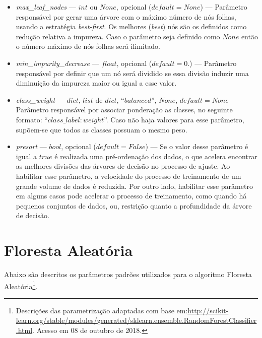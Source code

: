 \documentclass[
	12pt,				%
	oneside,			%
	a4paper,			%
	english,			%
	brazil				%
	]{abntex2ppgsi}
\begin{document}
{{\begin{apendicesenv}
\begin{itemize}
\item \textit{max\_leaf\_nodes} --- $int$ ou $None$, opcional ($default=None$) --- Parâmetro responsável por gerar uma árvore com o máximo número de nós folhas, usando a estratégia \textit{best-first}.
Os melhores (\textit{best}) nós são os definidos como redução relativa a impureza. Caso o parâmetro seja definido como $None$ então o número máximo de nós folhas será ilimitado. 
\item \textit{min\_impurity\_decrease} --- $float$, opcional ($default=0.$) --- Parâmetro responsável por definir que um nó será dividido se essa divisão induzir uma diminuição da impureza maior ou igual a esse valor.
\item \textit{class\_weight} --- $dict$, $list$ de $dict$, ``$balanced$'', $None$, $default=None$ --- Parâmetro responsável por associar ponderação as classes, no seguinte formato: ``${class\_label: weight}$''. Caso não haja valores para esse parâmetro, supõem-se que todos as classes possuam o mesmo peso. 
\item \textit{presort} --- $bool$, opcional ($default=False$) --- Se o valor desse parâmetro é igual a $true$ é realizada uma pré-ordenação dos dados, o que acelera encontrar as melhores divisões das árvores de decisão no processo de ajuste. Ao habilitar esse parâmetro, a velocidade do processo de treinamento de um grande volume de dados  é reduzida. Por outro lado, habilitar esse parâmetro em alguns casos pode acelerar o processo de treinamento, como quando há pequenos conjuntos de dados, ou, restrição quanto a profundidade da árvore de decisão.
\end{itemize}

\section{Floresta Aleatória}

Abaixo são descritos os parâmetros padrões utilizados para o algoritmo Floresta Aleatória\footnote{Descrições das parametrização adaptadas com base em:\url{http://scikit-learn.org/stable/modules/generated/sklearn.ensemble.RandomForestClassifier.html}. Acesso em 08 de outubro de 2018.}.


\end{apendicesenv}}}
\end{document}
